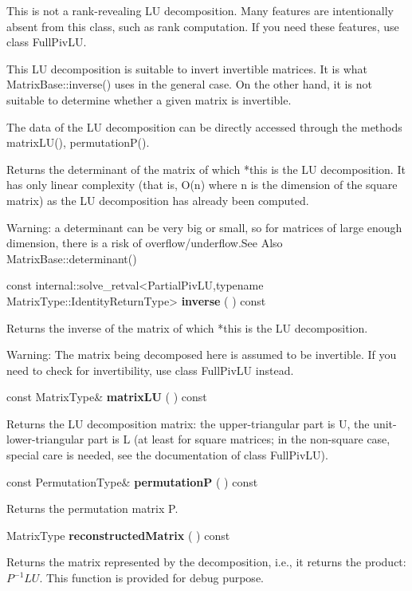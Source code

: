 This is not a rank-revealing LU decomposition. Many features are intentionally absent from this class, such as rank computation. If you need these features, use class FullPivLU.

This LU decomposition is suitable to invert invertible matrices. It is what MatrixBase::inverse() uses in the general case. On the other hand, it is not suitable to determine whether a given matrix is invertible.

The data of the LU decomposition can be directly accessed through the methods matrixLU(), permutationP().



Returns the determinant of the matrix of which *this is the LU decomposition. It has only linear complexity (that is, O(n) where n is the dimension of the square matrix) as the LU decomposition has already been computed.

Warning: a determinant can be very big or small, so for matrices of large enough dimension, there is a risk of overflow/underflow.See Also
MatrixBase::determinant() 

\vspace{0.3cm}
const internal::solve\_retval<PartialPivLU,typename MatrixType::IdentityReturnType> \textbf{inverse}  ( )  const 


Returns the inverse of the matrix of which *this is the LU decomposition.

Warning: The matrix being decomposed here is assumed to be invertible. If you need to check for invertibility, use class FullPivLU instead.


\vspace{0.3cm}
const MatrixType\& \textbf{matrixLU}  ( )  const 

Returns the LU decomposition matrix: the upper-triangular part is U, the unit-lower-triangular part is L (at least for square matrices; in the non-square case, special care is needed, see the documentation of class FullPivLU).


\vspace{0.3cm}
const PermutationType\& \textbf{permutationP}  ( )  const 

Returns the permutation matrix P. 


\vspace{0.3cm}
MatrixType \textbf{reconstructedMatrix}  ( )  const 

Returns the matrix represented by the decomposition, i.e., it returns the product: $P^{-1} L U$. This function is provided for debug purpose. 


